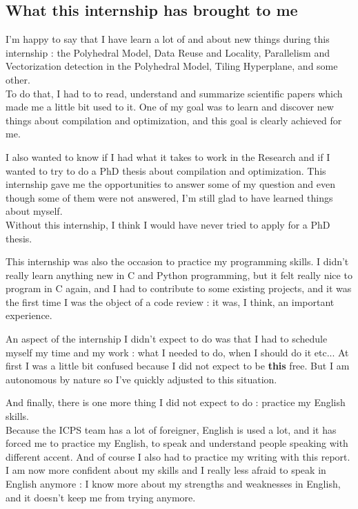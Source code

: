 \documentclass[paper=a4, fontsize=11pt]{scrartcl}
\numberwithin{equation}{section}        %
\numberwithin{figure}{section}          %
\numberwithin{table}{section}               %
\begin{document}
    \subsection{What this internship has brought to me}
        I'm happy to say that I have learn a lot of and about new things during this internship :
        the Polyhedral Model, Data Reuse and Locality, Parallelism and Vectorization detection
        in the Polyhedral Model, Tiling Hyperplane, and some other.\\
        To do that, I had to to read, understand and summarize scientific papers which made
        me a little bit used to it.
        One of my goal was to learn and discover new things about compilation and optimization,
        and this goal is clearly achieved for me.

        I also wanted to know if I had what it takes to work in the Research and if I wanted
        to try to do a PhD thesis about compilation and optimization. This internship gave me
        the opportunities to answer some of my question and even though some of them were
        not answered, I'm still glad to have learned things about myself.\\
        Without this internship, I think I would have never tried to apply for a PhD thesis.

        This internship was also the occasion to practice my programming skills. I didn't
        really learn anything new in C and Python programming, but it felt really nice to
        program in C again, and I had to contribute to some existing projects, and it was
        the first time I was the object of a code review : it was, I think, an important experience.

        An aspect of the internship I didn't expect to do was that I had to schedule myself
        my time and my work : what I needed to do, when I should do it etc... At first I
        was a little bit confused because I did not expect to be \textbf{this} free. But
        I am autonomous by nature so I've quickly adjusted to this situation.

        And finally, there is one more thing I did not expect to do : practice my English skills.\\
        Because the ICPS team has a lot of foreigner, English is used a lot, and it has forced
        me to practice my English, to speak and understand people speaking with different accent.
        And of course I also had to practice my writing with this report.
        I am now more confident about my skills and I really less afraid to speak in English
        anymore : I know more about my strengths and weaknesses in English, and it doesn't
        keep me from trying anymore.
\end{document}
